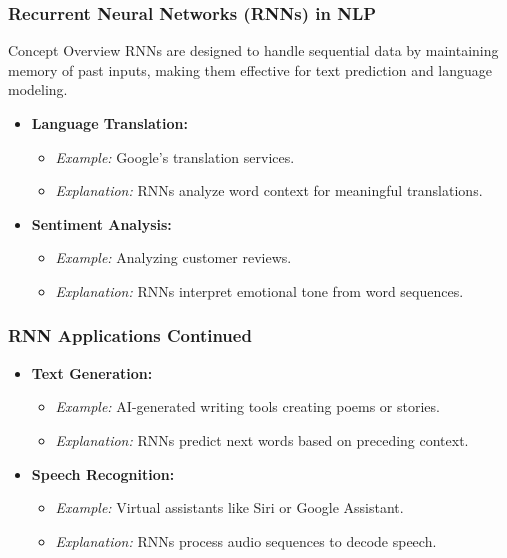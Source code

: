 \documentclass{beamer}
\begin{document}
\begin{frame}[fragile]
    \frametitle{Recurrent Neural Networks (RNNs) in NLP}
    
    \begin{block}{Concept Overview}
        RNNs are designed to handle sequential data by maintaining memory of past inputs, making them effective for text prediction and language modeling.
    \end{block}

    \begin{itemize}
        \item \textbf{Language Translation:}
            \begin{itemize}
                \item \textit{Example:} Google’s translation services.
                \item \textit{Explanation:} RNNs analyze word context for meaningful translations.
            \end{itemize}
        \item \textbf{Sentiment Analysis:}
            \begin{itemize}
                \item \textit{Example:} Analyzing customer reviews.
                \item \textit{Explanation:} RNNs interpret emotional tone from word sequences.
            \end{itemize}
    \end{itemize}
    
\end{frame}

\begin{frame}[fragile]
    \frametitle{RNN Applications Continued}
    
    \begin{itemize}
        \item \textbf{Text Generation:}
            \begin{itemize}
                \item \textit{Example:} AI-generated writing tools creating poems or stories.
                \item \textit{Explanation:} RNNs predict next words based on preceding context.
            \end{itemize}
        \item \textbf{Speech Recognition:}
            \begin{itemize}
                \item \textit{Example:} Virtual assistants like Siri or Google Assistant.
                \item \textit{Explanation:} RNNs process audio sequences to decode speech.
            \end{itemize}
    \end{itemize}
    
\end{frame}
\end{document}
